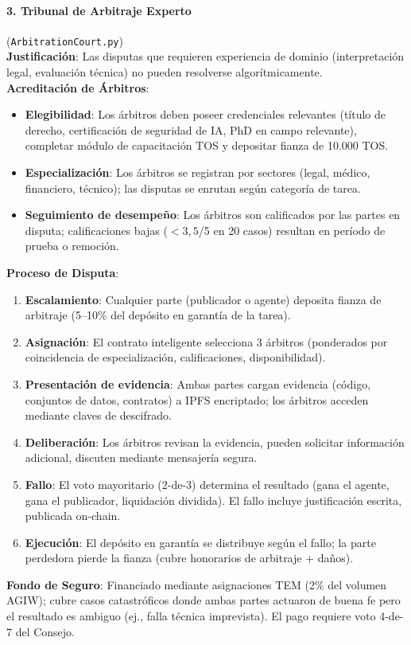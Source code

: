\documentclass[11pt]{article}
\begin{document}
\paragraph{3. Tribunal de Arbitraje Experto} (\texttt{ArbitrationCourt.py})\\
\textbf{Justificación}: Las disputas que requieren experiencia de dominio (interpretación legal, evaluación técnica) no pueden resolverse algorítmicamente.\\
\textbf{Acreditación de Árbitros}:
\begin{itemize}[noitemsep]
  \item \textbf{Elegibilidad}: Los árbitros deben poseer credenciales relevantes (título de derecho, certificación de seguridad de IA, PhD en campo relevante), completar módulo de capacitación TOS y depositar fianza de 10.000 TOS.
  \item \textbf{Especialización}: Los árbitros se registran por sectores (legal, médico, financiero, técnico); las disputas se enrutan según categoría de tarea.
  \item \textbf{Seguimiento de desempeño}: Los árbitros son calificados por las partes en disputa; calificaciones bajas ($<3,5$/5 en 20 casos) resultan en período de prueba o remoción.
\end{itemize}
\textbf{Proceso de Disputa}:
\begin{enumerate}[noitemsep]
  \item \textbf{Escalamiento}: Cualquier parte (publicador o agente) deposita fianza de arbitraje (5--10\% del depósito en garantía de la tarea).
  \item \textbf{Asignación}: El contrato inteligente selecciona 3 árbitros (ponderados por coincidencia de especialización, calificaciones, disponibilidad).
  \item \textbf{Presentación de evidencia}: Ambas partes cargan evidencia (código, conjuntos de datos, contratos) a IPFS encriptado; los árbitros acceden mediante claves de descifrado.
  \item \textbf{Deliberación}: Los árbitros revisan la evidencia, pueden solicitar información adicional, discuten mediante mensajería segura.
  \item \textbf{Fallo}: El voto mayoritario (2-de-3) determina el resultado (gana el agente, gana el publicador, liquidación dividida). El fallo incluye justificación escrita, publicada on-chain.
  \item \textbf{Ejecución}: El depósito en garantía se distribuye según el fallo; la parte perdedora pierde la fianza (cubre honorarios de arbitraje + daños).
\end{enumerate}
\textbf{Fondo de Seguro}: Financiado mediante asignaciones TEM (2\% del volumen AGIW); cubre casos catastróficos donde ambas partes actuaron de buena fe pero el resultado es ambiguo (ej., falla técnica imprevista). El pago requiere voto 4-de-7 del Consejo.
\end{document}
